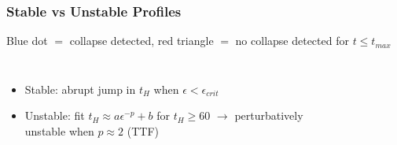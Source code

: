 \documentclass[mathserif,10pt]{beamer}
\newcommand{\bi}{\begin{itemize}}
\newcommand{\ei}{\end{itemize}}
\newcommand{\its}{\item}
\begin{document}
{\frame
{
  \frametitle{Stable vs Unstable Profiles}
  \begin{center}
  Blue dot $=$ collapse detected, red triangle $=$ no collapse detected for $t \leq t_{max}$
  \end{center}
  \vspace{-0.1in}
  \begin{columns}
    \vspace{-0.25in}
    \bi
    \its Stable: abrupt jump in $t_H$ when $\epsilon < \epsilon_{crit}$
    \its<2->{Unstable: fit $t_H \approx a \epsilon^{-p} + b$ for $t_H \geq 60$ $\to$ perturbatively unstable when $p \approx 2$ (TTF)}
    \ei
    \begin{figure}
      \centering

\end{figure}
\end{columns}}}
\end{document}
